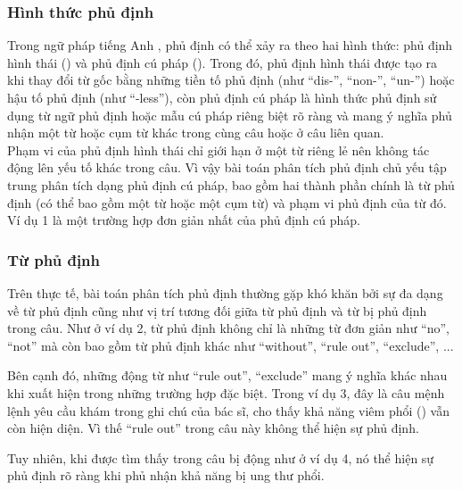 \subsubsection*{Hình thức phủ định}

Trong ngữ pháp tiếng Anh \cite{Givon1993}, phủ định có thể xảy ra theo hai hình thức: phủ định hình thái () và phủ định cú pháp (). Trong đó, phủ định hình thái được tạo ra khi thay đổi từ gốc bằng những tiền tố phủ định (như ``dis-'', ``non-'', ``un-'') hoặc hậu tố phủ định (như ``-less''), còn phủ định cú pháp là hình thức phủ định sử dụng từ ngữ phủ định hoặc mẫu cú pháp riêng biệt rõ ràng và mang ý nghĩa phủ nhận một từ hoặc cụm từ khác trong cùng câu hoặc ở câu liên quan.\\

Phạm vi của phủ định hình thái chỉ giới hạn ở một từ riêng lẻ nên không tác động lên yếu tố khác trong câu. Vì vậy bài toán phân tích phủ định chủ yếu tập trung phân tích dạng phủ định cú pháp, bao gồm hai thành phần chính là từ phủ định (có thể bao gồm một từ hoặc một cụm từ) và phạm vi phủ định của từ đó. Ví dụ 1 là một trường hợp đơn giản nhất của phủ định cú pháp.

\subsubsection*{Từ phủ định}

Trên thực tế, bài toán phân tích phủ định thường gặp khó khăn bởi sự đa dạng về từ phủ định cũng như vị trí tương đối giữa từ phủ định và từ bị phủ định trong câu. Như ở ví dụ 2, từ phủ định không chỉ là những từ đơn giản như ``no'', ``not'' mà còn bao gồm từ phủ định khác như ``without'', ``rule out'', ``exclude'', ... 


Bên cạnh đó, những động từ như ``rule out'', ``exclude'' mang ý nghĩa khác nhau khi xuất hiện trong những trường hợp đặc biệt. Trong ví dụ 3, đây là câu mệnh lệnh yêu cầu khám trong ghi chú của bác sĩ, cho thấy khả năng viêm phổi () vẫn còn hiện diện. Vì thế ``rule out'' trong câu này không thể hiện sự phủ định.


Tuy nhiên, khi được tìm thấy trong câu bị động như ở ví dụ 4, nó thể hiện sự phủ định rõ ràng khi phủ nhận khả năng bị ung thư phổi. 

